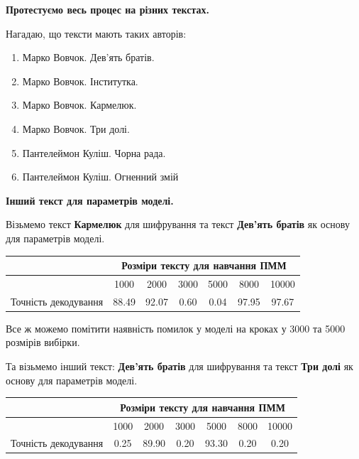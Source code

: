 \documentclass[12pt,a4paper]{article}
\begin{document}
\textbf{Протестуємо весь процес на різних текстах.}

Нагадаю, що тексти мають таких авторів:

\begin{enumerate}
  \item Марко Вовчок. Дев'ять братів.
  \item Марко Вовчок. Інститутка.
  \item Марко Вовчок. Кармелюк.
  \item Марко Вовчок. Три долі.
  \item Пантелеймон Куліш. Чорна рада.
  \item Пантелеймон Куліш. Огненний змій
\end{enumerate}

\textbf{Інший текст для параметрів моделі.}

Візьмемо текст \textbf{Кармелюк} для шифрування та текст \textbf{Дев'ять братів}
як основу для параметрів моделі.

\begin{center}
  \begin{tabular}{| c | c | c | c | c | c | c |}
    \hline 
    & \multicolumn{6}{|c|}{Розміри тексту для навчання ПММ} \\
    \hline 
    & 1000 & 2000 & 3000 & 5000 & 8000 & 10000 \\
    \hline 
    Точність декодування & 88.49 & 92.07 & 0.60 & 0.04 & 97.95 & 97.67 \\
    \hline 
  \end{tabular}
\end{center}

Все ж можемо помітити наявність помилок у моделі на кроках у 3000 та 5000 розмірів
вибірки.

Та візьмемо інший текст: \textbf{Дев'ять братів} для шифрування та текст \textbf{Три долі}
як основу для параметрів моделі.

\begin{center}
  \begin{tabular}{| c | c | c | c | c | c | c |}
    \hline 
    & \multicolumn{6}{|c|}{Розміри тексту для навчання ПММ} \\
    \hline 
    & 1000 & 2000 & 3000 & 5000 & 8000 & 10000 \\
    \hline 
    Точність декодування & 0.25 & 89.90 & 0.20 & 93.30 & 0.20 & 0.20 \\
    \hline 
  \end{tabular}
\end{center}
\end{document}
